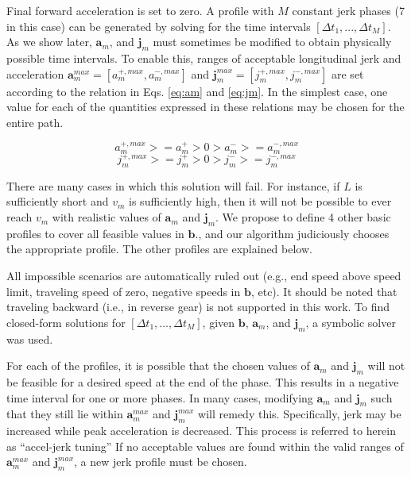 \documentclass[letterpaper, 10 pt, conference]{ieeeconf}  %
\begin{document}
Final forward acceleration is set to zero.
A profile with $M$ constant jerk phases (7 in this case) can be generated by solving for the time intervals $[\Delta t_1, ..., \Delta t_M]$.
As we show later, $\mathbf{a}_m$, and $\mathbf{j}_m$ must sometimes be modified to obtain physically possible time intervals.
To enable this, ranges of acceptable longitudinal jerk and acceleration $\mathbf{a}^{max}_m = [a^{+,max}_m , a^{-,max}_m]$ and $\mathbf{j}^{max}_m = [j^{+,max}_m , j^{-,max}_m]$ are set according to the relation in Eqs. \ref{eq:am} and \ref{eq:jm}.
In the simplest case, one value for each of the quantities expressed in these relations may be chosen for the entire path.

\begin{equation}
  a^{+,max}_m >= a^+_m > 0 > a^-_m >= a^{-,max}_m
  \label{eq:am}
\end{equation}
\begin{equation}
  j^{+,max}_m >= j^+_m > 0 > j^-_m >= j^{-,max}_m
  \label{eq:jm}
\end{equation}

There are many cases in which this solution will fail.
For instance, if $L$ is sufficiently short and $v_m$ is sufficiently high, then it will not be possible to ever reach $v_m$ with realistic values of $\mathbf{a}_m$ and $\mathbf{j}_m$.
We propose to define 4 other basic profiles to cover all feasible values in $\mathbf{b}$., and our algorithm judiciously chooses the appropriate profile.
The other profiles are explained below.

All impossible scenarios are automatically ruled out (e.g., end speed above speed limit, traveling speed of zero, negative speeds in $\mathbf{b}$, etc).
It should be noted that traveling backward (i.e., in reverse gear) is not supported in this work.
To find closed-form solutions for $[\Delta t_1, ..., \Delta t_M]$, given $\mathbf{b}$, $\mathbf{a}_m$, and $\mathbf{j}_m$, a symbolic solver was used.

For each of the profiles, it is possible that the chosen values of $\mathbf{a}_m$ and $\mathbf{j}_m$ will not be feasible for a desired speed at the end of the phase.
This results in a negative time interval for one or more phases.
In many cases, modifying $\mathbf{a}_m$ and $\mathbf{j}_m$ such that they still lie within $\mathbf{a}^{max}_m$ and $\mathbf{j}^{max}_m$ will remedy this.
Specifically, jerk may be increased while peak acceleration is decreased.
This process is referred to herein as ``accel-jerk tuning''
If no acceptable values are found within the valid ranges of $\mathbf{a}^{max}_m$ and $\mathbf{j}^{max}_m$, a new jerk profile must be chosen.
\end{document}
